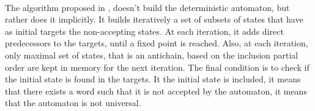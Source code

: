 \documentclass[letterpaper]{article}
\DeclarePairedDelimiter{\ceil}{\lceil}{\rceil}
\theoremstyle{definition}
\begin{document}


\paragraph{}

The algorithm proposed in \cite{AC_universality}, doesn't build
the deterministic automaton, but rather does it implicitly.
It builds iteratively a set of subsets of states
that have as initial targets the non-accepting states.
At each iteration,
it adds direct
predecessors to the targets, until a fixed point is reached.
Also, at each iteration,
only maximal set of states, that is an antichain,
based on the inclusion partial order are kept
in memory for the next iteration.
The final condition is to check if the initial state is found
in the targets. It the initial state is included, it means that
there exists a word such that it is not accepted by
the automaton, it means that the automaton is not universal.
\end{document}
